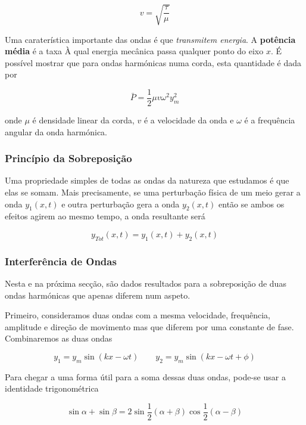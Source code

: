 \begin{equation}\label{eq:onda-trans-v}
    v=\sqrt{\frac{\tau}{\mu}}
\end{equation}

Uma caraterística importante das ondas é que \emph{transmitem energia}. A \textbf{potência média} é a taxa À qual energia mecânica passa qualquer ponto do eixo $x$. É possível mostrar que para ondas harmónicas numa corda, esta quantidade é dada por

\begin{equation}
    \bar{P}=\frac{1}{2}\mu v\omega^2y_m^2
\end{equation}

onde $\mu$ é densidade linear da corda, $v$ é a velocidade da onda e $\omega$ é a frequência angular da onda harmónica.

\subsubsection{Princípio da Sobreposição}
Uma propriedade simples de todas as ondas da natureza que estudamos é que elas se somam. Mais precisamente, se uma perturbação física de um meio gerar a onda $y_1(x,t)$ e outra perturbação gera a onda $y_2(x,t)$ então se ambos os efeitos agirem ao mesmo tempo, a onda resultante será

\begin{equation}
    y_{Tot}(x,t)=y_1(x,t)+y_2(x,t)
\end{equation}

\subsubsection{Interferência de Ondas}
Nesta e na próxima secção, são dados resultados para a sobreposição de duas ondas harmónicas que apenas diferem num aspeto.

Primeiro, consideramos duas ondas com a mesma velocidade, frequência, amplitude e direção de movimento mas que diferem por uma constante de fase. Combinaremos as duas ondas

\begin{equation}
    y_1=y_m\sin(kx-\omega t) \qquad y_2=y_m\sin(kx-\omega t + \phi)
\end{equation}

Para chegar a uma forma útil para a soma dessas duas ondas, pode-se usar a identidade trigonométrica

\begin{equation*}
    \sin\alpha+\sin\beta=2\sin\frac{1}{2}(\alpha+\beta)\cos\frac{1}{2}(\alpha-\beta)
\end{equation*}

